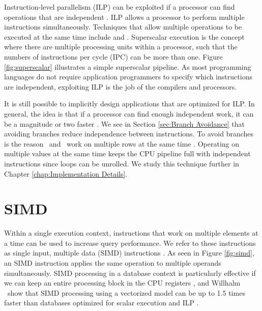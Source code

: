 Instruction-level parallelism (ILP) can be exploited if a processor can find operations that are independent \cite{Wikipedia_contributors2015-vg}. ILP allows a processor to perform multiple instructions simultaneously. Techniques that allow multiple operations to be executed at the same time include  and . Superscalar execution is the concept where there are multiple processing units within a processor, such that the numbers of instructions per cycle (IPC) can be more than one. Figure \ref{fig:superscalar} illustrates a simple superscalar pipeline. As most programming languages do not require application programmers to specify which instructions are independent, exploiting ILP is the job of the compilers and processors.

It is still possible to implicitly design applications that are optimized for ILP. In general, the idea is that if a processor can find enough independent work, it can be a magnitude or two faster \cite{Boncz2005-wj}. We see in Section \ref{sec:Branch Avoidance} that avoiding branches reduce independence between instructions. To avoid branches is the reason \monetx~and \blink~work on multiple rows at the same time \cite{Boncz2005-wj, Johnson2008-cp}. Operating on multiple values at the same time keeps the CPU pipeline full with independent instructions since loops can be unrolled. We study this technique further in Chapter \ref{chap:Implementation Details}.

\section{SIMD}
\label{sec:SIMD}
Within a single execution context, instructions that work on multiple elements at a time can be used to increase query performance. We refer to these instructions as single input, multiple data (SIMD) instructions \cite{Wikipedia_contributors2015-ax}. As seen in Figure \ref{fig:simd}, an SIMD instruction applies the same operation to multiple operands simultaneously. SIMD processing in a database context is particularly effective if we can keep an entire processing block in the CPU registers \cite{Neumann2011-uq}, and Willhalm \ea~show that SIMD processing using a vectorized model can be up to 1.5 times faster than databases optimized for scalar execution and ILP \cite{Willhalm2009-hu}.

